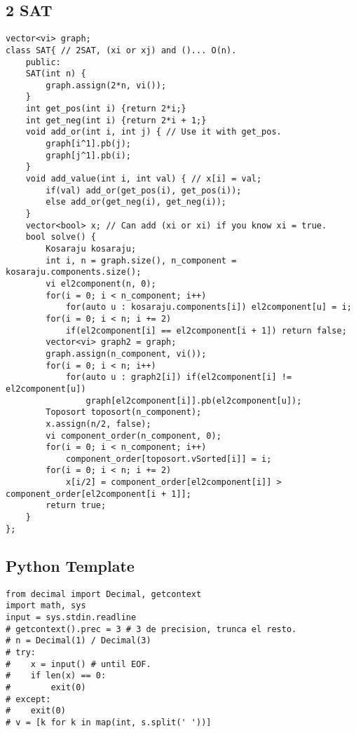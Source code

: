 \documentclass[a4paper]{article}
\begin{document}
\subsection*{2 SAT}
\begin{verbatim}
vector<vi> graph;
class SAT{ // 2SAT, (xi or xj) and ()... O(n).
    public:
    SAT(int n) {
        graph.assign(2*n, vi());
    }
    int get_pos(int i) {return 2*i;}
    int get_neg(int i) {return 2*i + 1;}
    void add_or(int i, int j) { // Use it with get_pos.
        graph[i^1].pb(j);
        graph[j^1].pb(i);
    }
    void add_value(int i, int val) { // x[i] = val;
        if(val) add_or(get_pos(i), get_pos(i));
        else add_or(get_neg(i), get_neg(i));
    }
    vector<bool> x; // Can add (xi or xi) if you know xi = true.
    bool solve() {
        Kosaraju kosaraju;
        int i, n = graph.size(), n_component = kosaraju.components.size();
        vi el2component(n, 0);
        for(i = 0; i < n_component; i++)
            for(auto u : kosaraju.components[i]) el2component[u] = i;
        for(i = 0; i < n; i += 2)
            if(el2component[i] == el2component[i + 1]) return false;
        vector<vi> graph2 = graph;
        graph.assign(n_component, vi());
        for(i = 0; i < n; i++) 
            for(auto u : graph2[i]) if(el2component[i] != el2component[u])
                graph[el2component[i]].pb(el2component[u]);
        Toposort toposort(n_component);
        x.assign(n/2, false);
        vi component_order(n_component, 0);
        for(i = 0; i < n_component; i++)
            component_order[toposort.vSorted[i]] = i;
        for(i = 0; i < n; i += 2)
            x[i/2] = component_order[el2component[i]] > component_order[el2component[i + 1]];
        return true;
    }
};
\end{verbatim}
\subsection*{Python Template}
\begin{verbatim}
from decimal import Decimal, getcontext
import math, sys
input = sys.stdin.readline
# getcontext().prec = 3 # 3 de precision, trunca el resto.
# n = Decimal(1) / Decimal(3)
# try:
#    x = input() # until EOF.
#    if len(x) == 0:
#        exit(0)
# except:
#    exit(0)
# v = [k for k in map(int, s.split(' '))]
\end{verbatim}
\end{document}
